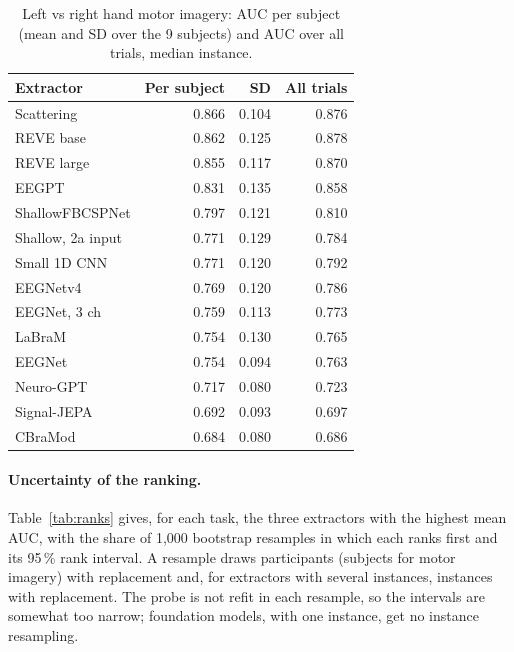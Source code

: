 \documentclass[11pt]{article}
\begin{document}
\begin{table}[h]
\centering\footnotesize\setlength{\tabcolsep}{4pt}
\caption{Left vs right hand motor imagery: AUC per subject (mean and SD over the 9 subjects) and
AUC over all trials, median instance.}
\label{tab:misubject}
\begin{tabular}{@{}lrrr@{}}
\toprule
Extractor & Per subject & SD & All trials \\
\midrule
Scattering & 0.866 & 0.104 & 0.876 \\
REVE base & 0.862 & 0.125 & 0.878 \\
REVE large & 0.855 & 0.117 & 0.870 \\
EEGPT & 0.831 & 0.135 & 0.858 \\
ShallowFBCSPNet & 0.797 & 0.121 & 0.810 \\
Shallow, 2a input & 0.771 & 0.129 & 0.784 \\
Small 1D CNN & 0.771 & 0.120 & 0.792 \\
EEGNetv4 & 0.769 & 0.120 & 0.786 \\
EEGNet, 3 ch & 0.759 & 0.113 & 0.773 \\
LaBraM & 0.754 & 0.130 & 0.765 \\
EEGNet & 0.754 & 0.094 & 0.763 \\
Neuro-GPT & 0.717 & 0.080 & 0.723 \\
Signal-JEPA & 0.692 & 0.093 & 0.697 \\
CBraMod & 0.684 & 0.080 & 0.686 \\
\bottomrule
\end{tabular}
\end{table}

\paragraph{Uncertainty of the ranking.} Table~\ref{tab:ranks} gives, for each task, the three
extractors with the highest mean AUC, with the share of 1,000 bootstrap resamples in which each
ranks first and its 95\,\% rank interval. A resample draws participants (subjects for motor
imagery) with replacement and, for extractors with several instances, instances with replacement.
The probe is not refit in each resample, so the intervals are somewhat too narrow; foundation
models, with one instance, get no instance resampling.
\end{document}
